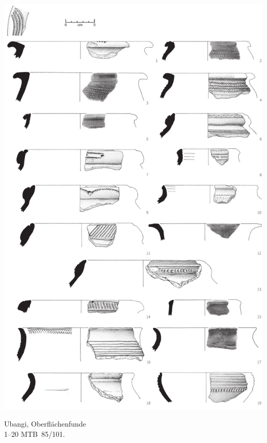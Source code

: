 \begin{pl}[H]
	\includegraphics{plt/Taf12.pdf}
	\vspace{.75em}\caption{\mbox{Ubangi}, Oberflächenfunde \\ 1--20 MTB~85/101.}
	\label{pl:12}
\end{pl}

